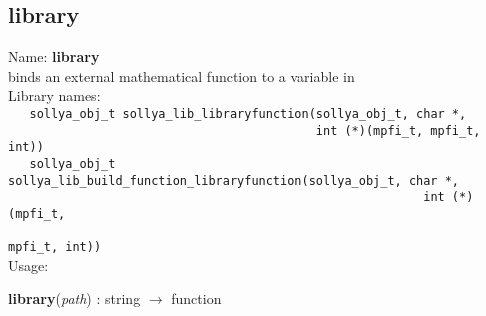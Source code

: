 \subsection{library}
\label{lablibrary}
\noindent Name: \textbf{library}\\
\phantom{aaa}binds an external mathematical function to a variable in \sollya\\[0.2cm]
\noindent Library names:\\
\verb|   sollya_obj_t sollya_lib_libraryfunction(sollya_obj_t, char *,|\\
\verb|                                           int (*)(mpfi_t, mpfi_t, int))|\\
\verb|   sollya_obj_t sollya_lib_build_function_libraryfunction(sollya_obj_t, char *,|\\
\verb|                                                          int (*)(mpfi_t,|\\
\verb|                                                                  mpfi_t, int))|\\[0.2cm]
\noindent Usage: 
\begin{center}
\textbf{library}(\emph{path}) : \textsf{string} $\rightarrow$ \textsf{function}\\
\end{center}
